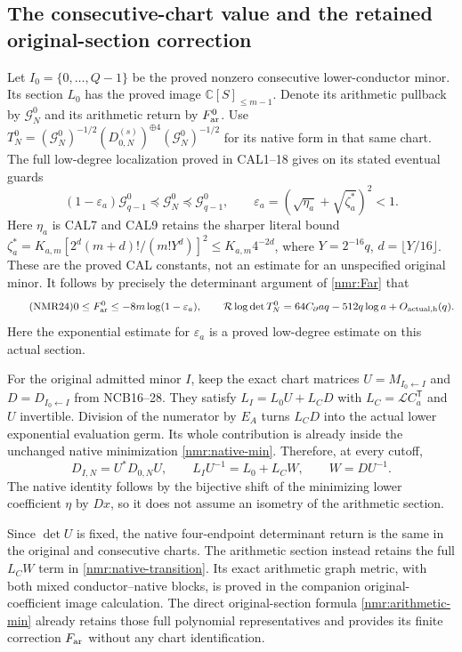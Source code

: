 \subsection{The consecutive-chart value and the retained original-section correction}
Let $I_0=\{0,\ldots,Q-1\}$ be the proved nonzero consecutive
lower-conductor minor. Its section $L_0$ has the proved image
$\mathbb C[S]_{\leq m-1}$. Denote its arithmetic pullback by
$\mathcal G_N^0$ and its arithmetic return by $F_{\rm ar}^0$.
Use $T_N^0=(\mathcal G_N^0)^{-1/2}
 (D_{0,N}^{(s)})^{\oplus4}(\mathcal G_N^0)^{-1/2}$ for its
native form in that same chart.
The full low-degree localization proved in CAL1--18 gives on its
stated eventual guards
\[
(1-\varepsilon_a)\mathcal G_{q-1}^0
\preceq\mathcal G_N^0\preceq\mathcal G_{q-1}^0,\qquad
\varepsilon_a=(\sqrt{\eta_a}+\sqrt{\zeta_a^*})^2<1 .
\]
Here $\eta_a$ is CAL7 and CAL9 retains the sharper literal bound
$\zeta_a^*=K_{a,m}[2^d(m+d)!/(m!Y^d)]^2\leq K_{a,m}4^{-2d}$,
where $Y=2^{-16}q$, $d=\lfloor Y/16\rfloor$.
These are the proved CAL constants, not an estimate for an
unspecified original minor.
It follows by precisely the determinant argument of
\eqref{nmr:Far} that
\begin{equation}\tag{NMR24}\label{nmr:consecutive-return}
0\leq F_{\rm ar}^0\leq-8m\log(1-\varepsilon_a),\qquad
\mathcal R\log\det T_N^0
=64C_\partial aq-512q\log a+O_{\rm actual,h}(q).
\end{equation}
Here the exponential estimate for $\varepsilon_a$ is a proved
low-degree estimate on this actual section.

For the original admitted minor $I$, keep the exact chart matrices
$U=M_{I_0\leftarrow I}$ and $D=D_{I_0\leftarrow I}$ from NCB16--28.
They satisfy
$L_I=L_0U+L_CD$ with $L_C=\mathcal LC_a^{\mathsf T}$ and $U$
invertible. Division of the numerator by $E_A$ turns $L_CD$ into
the actual lower exponential evaluation germ. Its whole contribution
is already inside the unchanged native minimization
\eqref{nmr:native-min}. Therefore, at every cutoff,
\begin{equation}\tag{NMR25}\label{nmr:native-transition}
D_{I,N}=U^*D_{0,N}U,\qquad
L_IU^{-1}=L_0+L_CW,\qquad W=DU^{-1}.
\end{equation}
The native identity follows by the bijective shift of the minimizing
lower coefficient $\eta$ by $Dx$, so it does not assume an isometry
of the arithmetic section.

Since $\det U$ is fixed, the native four-endpoint determinant return
is the same in the original and consecutive charts. The arithmetic
section instead retains the full $L_CW$ term in
\eqref{nmr:native-transition}. Its exact arithmetic graph metric,
with both mixed conductor--native blocks, is proved in the companion
original-coefficient image calculation. The direct original-section
formula \eqref{nmr:arithmetic-min} already retains those full
polynomial representatives and provides its finite correction
$F_{\rm ar}$ without any chart identification.

